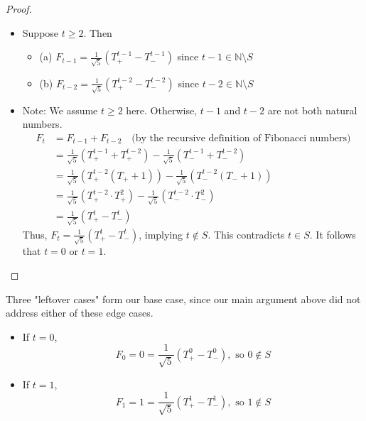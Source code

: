 \documentclass[11pt, draft]{article}
\begin{document}
\begin{enumerate}
\begin{proof}
              \begin{itemize}
                  \item Suppose $t \geq 2$. Then
                        \begin{itemize}
                            \item (a) $F_{t-1} = \frac{1}{\sqrt{5}} \left( T_+^{t-1} - T_-^{t-1} \right)$ since $t-1 \in \mathbb{N} \setminus S$
                            \item (b) $F_{t-2} = \frac{1}{\sqrt{5}} \left( T_+^{t-2} - T_-^{t-2} \right)$ since $t-2 \in \mathbb{N} \setminus S$
                        \end{itemize}
                  \item Note: We assume $t \geq 2$ here. Otherwise, $t-1$ and $t-2$ are not both
                        natural numbers.
                        \[
                            \begin{aligned}
                                F_t & = F_{t-1} + F_{t-2} \quad \text{(by the recursive definition of Fibonacci numbers)}                                 \\
                                    & = \frac{1}{\sqrt{5}} \left( T_+^{t-1} + T_+^{t-2} \right) - \frac{1}{\sqrt{5}} \left( T_-^{t-1} + T_-^{t-2} \right) \\
                                    & = \frac{1}{\sqrt{5}} \left( T_+^{t-2} (T_+ + 1) \right) - \frac{1}{\sqrt{5}} \left( T_-^{t-2} (T_- + 1) \right)     \\
                                    & = \frac{1}{\sqrt{5}} \left( T_+^{t-2} \cdot T_+^2 \right) - \frac{1}{\sqrt{5}} \left( T_-^{t-2} \cdot T_-^2 \right) \\
                                    & = \frac{1}{\sqrt{5}} \left( T_+^t - T_-^t \right)
                            \end{aligned}
                        \]
                        Thus, $F_t = \frac{1}{\sqrt{5}} \left( T_+^t - T_-^t \right)$, implying $t
                            \notin S$. This contradicts $t \in S$. It follows that $t = 0$ or $t = 1$.
              \end{itemize}
          \end{proof}
          \begin{remark} Three "leftover cases" form our base case, since our main argument above did not address either of these edge cases.
          \end{remark}
          \begin{itemize}
              \item If $t = 0$,
                    \[
                        F_0 = 0 = \frac{1}{\sqrt{5}} \left( T_+^0 - T_-^0 \right), \text{ so } 0 \notin S
                    \]
              \item If $t = 1$,
                    \[
                        F_1 = 1 = \frac{1}{\sqrt{5}} \left( T_+^1 - T_-^1 \right), \text{ so } 1 \notin S
                    \]
          \end{itemize}


\end{enumerate}
\end{document}
